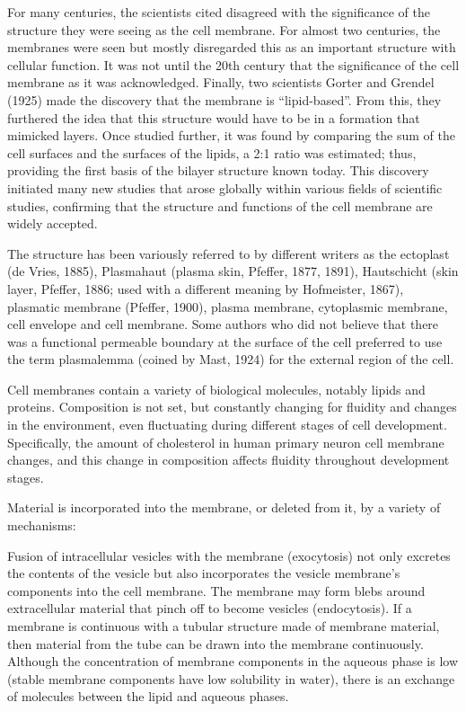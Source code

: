 For many centuries, the scientists cited disagreed with the significance of the structure they were seeing as the cell membrane. For almost two centuries, the membranes were seen but mostly disregarded this as an important structure with cellular function. It was not until the 20th century that the significance of the cell membrane as it was acknowledged. Finally, two scientists Gorter and Grendel (1925) made the discovery that the membrane is ``lipid-based''. From this, they furthered the idea that this structure would have to be in a formation that mimicked layers. Once studied further, it was found by comparing the sum of the cell surfaces and the surfaces of the lipids, a 2:1 ratio was estimated; thus, providing the first basis of the bilayer structure known today. This discovery initiated many new studies that arose globally within various fields of scientific studies, confirming that the structure and functions of the cell membrane are widely accepted.

The structure has been variously referred to by different writers as the ectoplast (de Vries, 1885), Plasmahaut (plasma skin, Pfeffer, 1877, 1891), Hautschicht (skin layer, Pfeffer, 1886; used with a different meaning by Hofmeister, 1867), plasmatic membrane (Pfeffer, 1900), plasma membrane, cytoplasmic membrane, cell envelope and cell membrane. Some authors who did not believe that there was a functional permeable boundary at the surface of the cell preferred to use the term plasmalemma (coined by Mast, 1924) for the external region of the cell.

Cell membranes contain a variety of biological molecules, notably lipids and proteins. Composition is not set, but constantly changing for fluidity and changes in the environment, even fluctuating during different stages of cell development. Specifically, the amount of cholesterol in human primary neuron cell membrane changes, and this change in composition affects fluidity throughout development stages.

Material is incorporated into the membrane, or deleted from it, by a variety of mechanisms:

Fusion of intracellular vesicles with the membrane (exocytosis) not only excretes the contents of the vesicle but also incorporates the vesicle membrane's components into the cell membrane. The membrane may form blebs around extracellular material that pinch off to become vesicles (endocytosis).
If a membrane is continuous with a tubular structure made of membrane material, then material from the tube can be drawn into the membrane continuously.
Although the concentration of membrane components in the aqueous phase is low (stable membrane components have low solubility in water), there is an exchange of molecules between the lipid and aqueous phases.

